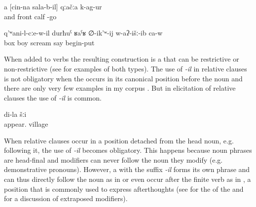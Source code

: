 \begin{exe}
	\ex	\label{ex:‎‎‎And the calf before him fell down minor}
	\gll	a	[cin-na	sala-b-il]	qːačːa	k-ag-ur\\
		and		front	calf	-go\\
	\glt	{}
	
	\ex	\label{ex:‎When he suspected, that he had left, the boy in the box started to scream minor}
	\gll	q'ʷani-l-cːe-w-il	durħuˁ	ʁaˁʁ	∅-ik'ʷ-ij	w-aʔ-išː-ib	ca-w\\
		box	boy	scream	say	begin-put	\\
	\glt	{}
\end{exe}

When added to verbs the resulting construction is a  that can be restrictive or non-restrictive (see  for examples of both types). The use of \textit{-il} in relative clauses is not obligatory  when the  occurs in its canonical position before the noun and there are only very few examples in my corpus . But in elicitation of relative clauses the use of \textit{-il} is common. 

\begin{exe}
	\ex	\label{ex:the village where I was born}
	\gll	[du	hak'-ub-il]	di-la	šːi\\
			appear.		village\\
	\glt	{}
\end{exe}

When relative clauses occur in a position detached from the head noun, e.g. following it, the use of \textit{-il} becomes obligatory. This happens because noun phrases are head-final and modifiers can never follow the noun they modify (e.g. demonstrative pronouns). However, a  with the suffix \textit{-il} forms its own phrase and can thus directly follow the noun as in  or even occur after the finite verb as in , a position that is commonly used to express afterthoughts (see  for the  of the  and  for a discussion of extraposed modifiers).


